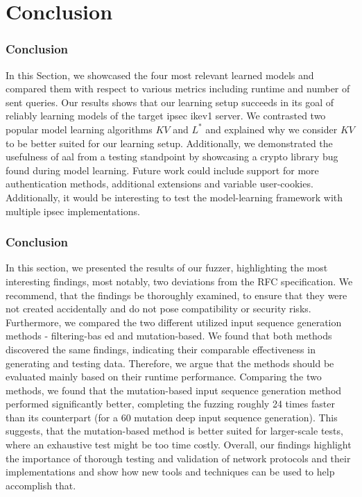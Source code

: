 %
%
% 
% 
% 

\chapter{Conclusion}

\label{chap:Conclusion}

\subsection{Conclusion}
In this Section, we showcased the four most relevant learned models and compared them with respect to various metrics including runtime and number of sent queries. Our results shows that our learning setup succeeds in its goal of reliably learning models of the target \ac{ipsec} \ac{ike}v1 server. We contrasted two popular model learning algorithms $KV$ and $L^*$ and explained why we consider $KV$ to be better suited for our learning setup. Additionally, we demonstrated the usefulness of \ac{aal} from a testing standpoint by showcasing a crypto library bug found during model learning. Future work could include support for more authentication methods, additional extensions and variable user-cookies. Additionally, it would be interesting to test the model-learning framework with multiple \ac{ipsec} implementations.

\subsection{Conclusion}
In this section, we presented the results of our fuzzer, highlighting the most interesting findings, most notably, two deviations from the RFC specification.  We recommend, that the findings be thoroughly examined, to ensure that they were not created accidentally and do not pose compatibility or security risks. Furthermore, we compared the two different utilized input sequence generation methods - filtering-bas ed and mutation-based. We found that both methods discovered the same findings, indicating their comparable effectiveness in generating and testing data. Therefore, we argue that the methods should be evaluated mainly based on their runtime performance. Comparing the two methods, we found that the mutation-based input sequence generation method performed significantly better, completing the fuzzing roughly 24 times faster than its counterpart (for a 60 mutation deep input sequence generation). This suggests, that the mutation-based method is better suited for larger-scale tests, where an exhaustive test might be too time costly. 
Overall, our findings highlight the importance of thorough testing and validation of network protocols and their implementations and show how new tools and techniques can be used to help accomplish that.

